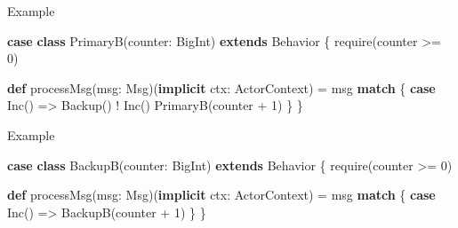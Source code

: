 \documentclass[ignorenonframetext,]{beamer}
\newenvironment{Shaded}{}{}
\newcommand{\DecValTok}[1]{\textcolor[rgb]{0.25,0.63,0.44}{#1}}
\newcommand{\FunctionTok}[1]{\textcolor[rgb]{0.02,0.16,0.49}{#1}}
\newcommand{\KeywordTok}[1]{\textcolor[rgb]{0.00,0.44,0.13}{\textbf{#1}}}
\newcommand{\NormalTok}[1]{#1}
\begin{document}
\begin{frame}[fragile]{%
\protect\hypertarget{example-2}{%
Example}}

\begin{Shaded}
\begin{Highlighting}[]
\KeywordTok{case} \KeywordTok{class} \FunctionTok{PrimaryB}\NormalTok{(counter: BigInt) }\KeywordTok{extends}\NormalTok{ Behavior \{}
  \FunctionTok{require}\NormalTok{(counter >= }\DecValTok{0}\NormalTok{)}

  \KeywordTok{def} \FunctionTok{processMsg}\NormalTok{(msg: Msg)(}\KeywordTok{implicit}\NormalTok{ ctx: ActorContext) =}
\NormalTok{    msg }\KeywordTok{match}\NormalTok{ \{}
      \KeywordTok{case} \FunctionTok{Inc}\NormalTok{() =>}
        \FunctionTok{Backup}\NormalTok{() ! }\FunctionTok{Inc}\NormalTok{()}
        \FunctionTok{PrimaryB}\NormalTok{(counter + }\DecValTok{1}\NormalTok{)}
\NormalTok{    \}}
\NormalTok{\}}
\end{Highlighting}
\end{Shaded}

\end{frame}

\begin{frame}[fragile]{%
\protect\hypertarget{example-3}{%
Example}}

\begin{Shaded}
\begin{Highlighting}[]
\KeywordTok{case} \KeywordTok{class} \FunctionTok{BackupB}\NormalTok{(counter: BigInt) }\KeywordTok{extends}\NormalTok{ Behavior \{}
  \FunctionTok{require}\NormalTok{(counter >= }\DecValTok{0}\NormalTok{)}

  \KeywordTok{def} \FunctionTok{processMsg}\NormalTok{(msg: Msg)(}\KeywordTok{implicit}\NormalTok{ ctx: ActorContext) =}
\NormalTok{    msg }\KeywordTok{match}\NormalTok{ \{}
      \KeywordTok{case} \FunctionTok{Inc}\NormalTok{() => }\FunctionTok{BackupB}\NormalTok{(counter + }\DecValTok{1}\NormalTok{)}
\NormalTok{    \}}
\NormalTok{\}}
\end{Highlighting}
\end{Shaded}

\end{frame}
\end{document}
